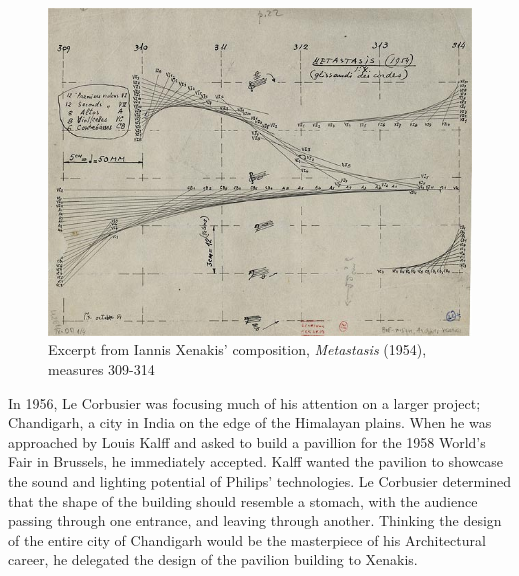 \documentclass{tufte-book}
\begin{document}
\begin{figure}[h]
  \includegraphics[width=\linewidth]{XenakisMetastasis.jpg}
  \caption{Excerpt from Iannis Xenakis' composition,
    \textit{Metastasis} (1954), measures 309-314}
  \label{fig:metastasis}
\end{figure}

In 1956, Le Corbusier was focusing much of his attention on a larger
project; Chandigarh, a city in India on the edge of the Himalayan
plains. When he was approached by Louis Kalff and asked to build a
pavillion for the 1958 World's Fair in Brussels, he immediately
accepted. Kalff wanted the pavilion to showcase the sound and lighting
potential of Philips' technologies. Le Corbusier determined that
the shape of the building should resemble a stomach, with the audience
passing through one entrance, and leaving through another. Thinking
the design of the entire city of Chandigarh would be the masterpiece
of his Architectural career,\cite{Flint2013} he delegated the design
of the pavilion building to Xenakis.\cite{Clarke2012}
\end{document}
